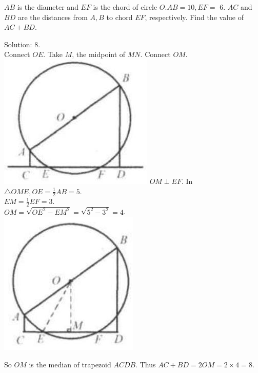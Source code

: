 \documentclass{article}
\begin{document}
\(A B\) is the diameter and \(E F\) is the chord of circle \(O . A B=10, E F=\) 6. \(A C\) and \(B D\) are the distances from \(A, B\) to chord \(E F\), respectively. Find the value of \(A C+B D\).

Solution: 8.\\
Connect \(O E\). Take \(M\), the midpoint of \(M N\). Connect \(O M\).\\
\includegraphics[width=\textwidth]{images/152(3).jpg} \(O M \perp E F\). In \(\triangle O M E, O E=\frac{1}{2} A B=5\).\\
\(E M=\frac{1}{2} E F=3\).\\
\(O M=\sqrt{O E^{2}-E M^{2}}=\sqrt{5^{2}-3^{2}}=4\).\\
\centering
\includegraphics[width=\textwidth]{images/152(2).jpg}

So \(O M\) is the median of trapezoid \(A C D B\). Thus \(A C+B D=2 O M=2 \times 4=8\).\\
\end{document}
